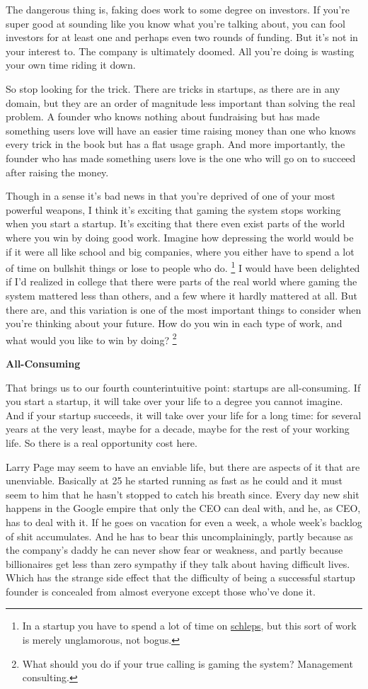\documentclass[12pt]{book}
\begin{document}
The dangerous thing is, faking does work to some degree on investors. If
you're super good at sounding like you know what you're talking about,
you can fool investors for at least one and perhaps even two rounds of
funding. But it's not in your interest to. The company is ultimately
doomed. All you're doing is wasting your own time riding it down.

So stop looking for the trick. There are tricks in startups, as there
are in any domain, but they are an order of magnitude less important
than solving the real problem. A founder who knows nothing about
fundraising but has made something users love will have an easier time
raising money than one who knows every trick in the book but has a flat
usage graph. And more importantly, the founder who has made something
users love is the one who will go on to succeed after raising the money.

Though in a sense it's bad news in that you're deprived of one of your
most powerful weapons, I think it's exciting that gaming the system
stops working when you start a startup. It's exciting that there even
exist parts of the world where you win by doing good work. Imagine how
depressing the world would be if it were all like school and big
companies, where you either have to spend a lot of time on bullshit
things or lose to people who do. \footnote{In a startup you have to spend a lot of time on
\href{schlep.html}{schleps}, but this sort of work is merely
unglamorous, not bogus.} I would have
been delighted if I'd realized in college that there were parts of the
real world where gaming the system mattered less than others, and a few
where it hardly mattered at all. But there are, and this variation is
one of the most important things to consider when you're thinking about
your future. How do you win in each type of work, and what would you
like to win by doing? \footnote{What should you do if your true calling is gaming the system?
Management consulting.}

\textbf{All-Consuming}

That brings us to our fourth counterintuitive point: startups are
all-consuming. If you start a startup, it will take over your life to a
degree you cannot imagine. And if your startup succeeds, it will take
over your life for a long time: for several years at the very least,
maybe for a decade, maybe for the rest of your working life. So there is
a real opportunity cost here.

Larry Page may seem to have an enviable life, but there are aspects of
it that are unenviable. Basically at 25 he started running as fast as he
could and it must seem to him that he hasn't stopped to catch his breath
since. Every day new shit happens in the Google empire that only the CEO
can deal with, and he, as CEO, has to deal with it. If he goes on
vacation for even a week, a whole week's backlog of shit accumulates.
And he has to bear this uncomplainingly, partly because as the company's
daddy he can never show fear or weakness, and partly because
billionaires get less than zero sympathy if they talk about having
difficult lives. Which has the strange side effect that the difficulty
of being a successful startup founder is concealed from almost everyone
except those who've done it.
\end{document}
